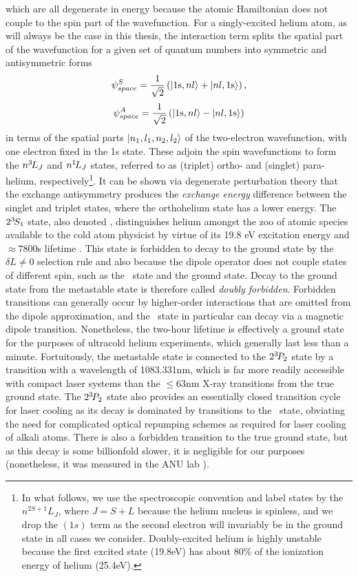 	\noindent which are all degenerate in energy because the atomic Hamiltonian does not couple to the spin part of the wavefunction.
	For a singly-excited helium atom, as will always be the case in this thesis, the interaction term splits the spatial part of the wavefunction for a given set of quantum numbers into symmetric and antisymmetric forms
	$$
	\psi^{S}_{space} = \frac{1}{\sqrt{2}}\left(|1\textrm{s},nl\rangle +|nl,1\textrm{s}\rangle\right),
	$$
	$$
	\psi^{A}_{space} = \frac{1}{\sqrt{2}}\left(|1\textrm{s},nl\rangle  - |nl,1\textrm{s}\rangle\right)
	$$
	in terms of the spatial parts $|n_1,l_1,n_2,l_2\rangle$ of the two-electron wavefunction, with one electron fixed in the 1s state.
	These adjoin the spin wavefunctions to form the $n^{3\!} L_{J}$ and $n^{1\!} L_{J}$ states, referred to as (triplet) ortho- and (singlet) para-helium, respectively\footnote{In what follows, we use the spectroscopic convention and label states by the $n^{2S+1}L_J$, where $J=S+L$ because the helium nucleus is spinless, and we drop the $(1s)$ term as the second electron will invariably be in the ground state in all cases we consider. Doubly-excited helium is highly unstable because the first excited state (19.8eV) has about 80\% of the ionization energy of helium (25.4eV).}.
	It can be shown via degenerate perturbation theory that the exchange antisymmetry produces the \emph{exchange energy} difference between the singlet and triplet states, where the  orthohelium state has a lower energy.
	 The $2^{3\!}S_1$ state, also denoted \mhe, distinguishes helium amongst the zoo of atomic species available to the cold atom physicist by virtue of its 19.8 eV excitation energy and $\approx 7800$s lifetime \cite{Hodgman09_mhe}.
	 This state is forbidden to decay to the ground state by the $\delta L\neq0$ selection rule and also because the dipole operator does not couple states of different spin, such as the \mhe~state and the ground state.
	Decay to the ground state from the metastable state is  therefore called \emph{doubly forbidden}.
	Forbidden transitions can generally occur by higher-order interactions that are omitted from the dipole approximation, and the \mhe~state in particular can decay via a magnetic dipole transition.
	Nonetheless, the two-hour lifetime is effectively a ground state for the purposes of ultracold helium experiments, which generally last less than a minute.
	Fortuitously, the metastable state is connected to the $2^{3\!} P_2$ state by a transition with a wavelength of 1083.331nm, which is far more readily accessible with compact laser systems than the $\leq 63$nm X-ray transitions from the true ground state.
	The $2^{3\!} P_2$ state also provides an essentially closed transition cycle for laser cooling as its decay is dominated by transitions to the \mhe~state, obviating the need for complicated optical repumping schemes as required for laser cooling of alkali atoms.
	There is also a forbidden transition to the true ground state, but as this decay is some billionfold slower, it is negligible for our purposes (nonetheless, it was measured in the ANU lab \cite{Hodgman09_23P}).


